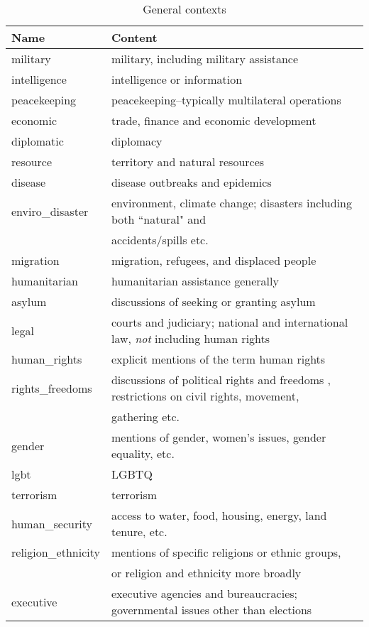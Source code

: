 \documentclass[11pt]{report}
\begin{document}
\begin{table}[htp]
\caption{General contexts }
\begin{center}
\begin{tabular}{|l|l|}
\hline
Name & Content \\
\hline
military & military, including military assistance \\
intelligence & intelligence or information \\
peacekeeping & peacekeeping–typically multilateral operations \\
economic & trade, finance and economic development \\
diplomatic & diplomacy \\
resource & territory and natural resources \\
disease & disease outbreaks and epidemics \\
enviro\_disaster & environment, climate change; disasters including both ``natural" and \\&\hspace{6pt} accidents/spills etc.\\
migration  & migration, refugees, and displaced people \\
humanitarian & humanitarian assistance generally \\
asylum & discussions of seeking or granting asylum \\
legal & courts and judiciary; national and international law, \emph{not} including human rights \\ 
human\_rights & explicit mentions of the term human rights \\ 
rights\_freedoms & discussions of political rights and freedoms , restrictions on civil rights, movement, \\
&\hspace{6pt} gathering etc.\\
gender & mentions of gender, women's issues, gender equality, etc. \\
lgbt & LGBTQ \\
terrorism & terrorism \\
human\_security & access to water, food, housing, energy, land tenure, etc. \\
religion\_ethnicity & mentions of specific religions or ethnic groups,  \\&\hspace{6pt} or religion and ethnicity more broadly \\
executive & executive agencies and bureaucracies; governmental issues other than elections \\

\end{tabular}
\end{center}
\end{table}
\end{document}
